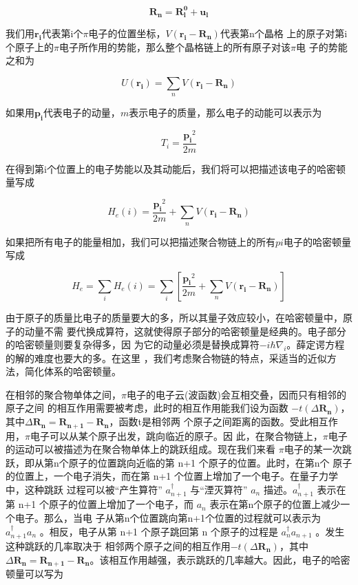 \documentclass[12pt,]{report}
\begin{document}
\begin{equation}
\bm{R_n} = \bm{R_l^{0}} + \bm{u_l}
\end{equation}

\noindent
我们用\(\bm{r_i}\)代表第i个\(\pi\)电子的位置坐标，\(V(\bm{r_i} - \bm{R_n})\)代表第n个晶格
上的原子对第i个原子上的\(\pi\)电子所作用的势能，那么整个晶格链上的所有原子对该\(\pi\)电
子的势能之和为

\begin{equation}
U(\bm{r_i}) = \sum\limits_n V(\bm{r_i} - \bm{R_n})
\end{equation}

\noindent
如果用\(\bm{p_i}\)代表电子的动量，\(m\)表示电子的质量，那么电子的动能可以表示为

\begin{equation}
T_i = \frac{\bm{p_i}^2}{2 m}
\end{equation}

\noindent
在得到第i个位置上的电子势能以及其动能后，我们将可以把描述该电子的哈密顿量写成

\begin{equation}
H_e(i) = \frac{\bm{p_i}^2}{2 m} + \sum\limits_n V(\bm{r_i} - \bm{R_n})
\end{equation}

\noindent
如果把所有电子的能量相加，我们可以把描述聚合物链上的所有\(pi\)电子的哈密顿量写成

\begin{equation}
H_e = \sum\limits_i H_e(i) = \sum\limits_i [\frac{\bm{p_i}^2}{2 m} + \sum\limits_n
V(\bm{r_i} - \bm{R_n})]
\end{equation}

\noindent
由于原子的质量比电子的质量要大的多，所以其量子效应较小，在哈密顿量中，原子的动量不需
要代换成算符，这就使得原子部分的哈密顿量是经典的。电子部分的哈密顿量则要复杂得多，因
为它的动量必须是替换成算符\(-i\hbar\nabla_i\)。薛定谔方程的解的难度也要大的多。在这里
，我们考虑聚合物链的特点，采适当的近似方法，简化体系的哈密顿量。

在相邻的聚合物单体之间，\(\pi\)电子的电子云(波函数)会互相交叠，因而只有相邻的原子之间
的相互作用需要被考虑，此时的相互作用能我们设为函数
\(-t(\Delta\bm{R_n})\)，其中\(\Delta\bm{R_n} = \bm{R_{n+1}} - \bm{R_n}\)，函数t是相邻两
个原子之间距离的函数。受此相互作用，\(\pi\)电子可以从某个原子出发，跳向临近的原子。因
此，在聚合物链上，\(\pi\)电子的运动可以被描述为在聚合物单体上的跳跃组成。现在我们来看
\(\pi\)电子的某一次跳跃，即从第n个原子的位置跳向近临的第 n+1
个原子的位置。此时，在第n个 原子的位置上，一个电子消失，而在第 n+1
个位置上增加了一个电子。在量子力学中，这种跳跃 过程可以被``产生算符''
\(a_{n+1}^\dagger\) 与``湮灭算符'' \(a_{n}\) 描述。\(a_{n+1}^\dagger\)
表示在第 n+1 个原子的位置上增加了一个电子，而 \(a_n\)
表示在第n个原子的位置上减少一个电子。那么，当电
子从第n个位置跳向第n+1个位置的过程就可以表示为 \(a_{n+1}^{\dagger}a_n\)
。相反，电子从第 n+1 个原子跳回第 n 个原子的过程是
\(a_{n}^{\dagger}a_{n+1}\) 。发生这种跳跃的几率取决于
相邻两个原子之间的相互作用\(-t(\Delta\bm{R_n})\)，其中
\(\Delta\bm{R_n}=\bm{R_{n+1}} - \bm{R_{n}}\)。该相互作用越强，表示跳跃的几率越大。因此，电子的哈密顿量可以写为
\end{document}
